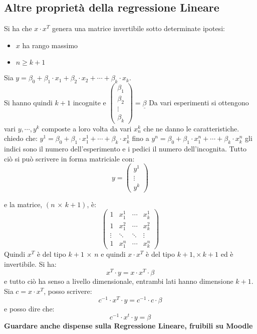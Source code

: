 \documentclass[a4paper,12pt, oneside]{book}
\begin{document}
\subsection{Altre proprietà della regressione Lineare}
Si ha che $x\cdot x^T$ genera una matrice invertibile sotto determinate ipotesi:
\begin{itemize}
	\item $x$ ha rango massimo
	\item $n\geq k+1$
\end{itemize}
Sia $y=\beta_0+\beta_1\cdot x_1+\beta_2\cdot x_2+\cdots+\beta_k\cdot x_k$.\\ Si hanno quindi $k+1$ incognite e $
	\left(\begin{matrix}
			\beta_1 \\
			\beta_2 \\
			\vdots  \\
			\beta_k
		\end{matrix}\right)=\underline{\beta}
$
Da vari esperimenti si ottengono vari $y,\cdots, y^k$ composte a loro volta da vari $x^k_n$ che ne danno le caratteristiche.\\
chiedo che: $y^1=\beta_0+\beta_1\cdot x^1_1+\cdots+\beta_k\cdot x^1_k$
fino a $y^n=\beta_0+\beta_1\cdot x^n_1+\cdots+\beta_k\cdot x^n_k$
gli indici sono il numero dell'esperimento e i pedici il numero dell'incognita. Tutto ciò si può scrivere in forma matriciale con:
$$
	y=\left(\begin{matrix}
			y^1    \\
			\vdots \\
			y^k
		\end{matrix}\right)
$$

e la matrice, $(n\,\times\, k+1)$, è:
$$
	\left(\begin{matrix}
			1      & x_1^1  & \cdots & x_k^1  \\
			1      & x_1^2  & \cdots & x_k^2  \\
			\vdots & \ddots & \ddots & \vdots \\
			1      & x_1^n  & \cdots & x_k^n
		\end{matrix}\right)
$$
Quindi $x^T$ è del tipo $k+1\,\times\, n$ e quindi $x\cdot x^T$ è del tipo $k+1,\times\, k+1$ ed è invertibile.
Si ha: $$x^T\cdot y = x\cdot x^T\cdot \beta$$
e tutto ciò ha senso a livello dimensionale, entrambi lati hanno dimensione $k+1$. Sia $c=x\cdot x^T$, posso scrivere: $$c^{-1}\cdot x^T\cdot y=c^{-1}\cdot c\cdot \beta$$ e posso dire che: $$c^{-1}\cdot x^t\cdot y=\beta$$
\textbf{Guardare anche dispense sulla Regressione Lineare, fruibili su Moodle}
\end{document}
